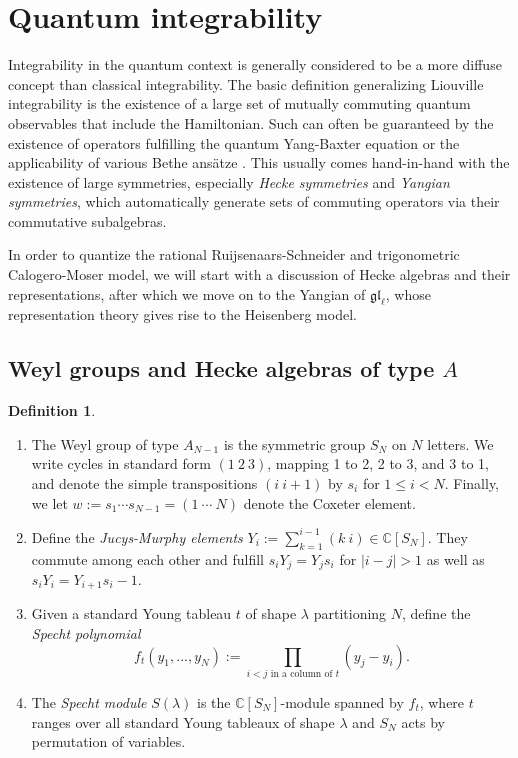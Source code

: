 \documentclass[11pt]{report}
\theoremstyle{definition}
\newtheorem{definition}[theorem]{Definition}
\theoremstyle{remark}
\theoremstyle{remark}
\newcommand{\C}{\mathbb{C}}
\begin{document}
\section{Quantum integrability}

Integrability in the quantum context is generally considered to be a more diffuse concept than classical integrability. The basic definition generalizing Liouville integrability is the existence of a large set of mutually commuting quantum observables that include the Hamiltonian. Such can often be guaranteed by the existence of operators fulfilling the quantum Yang-Baxter equation or the applicability of various Bethe ansätze \cite{book:arutyunov:betheAnsatz}. This usually comes hand-in-hand with the existence of large symmetries, especially \emph{Hecke symmetries} and \emph{Yangian symmetries}, which automatically generate sets of commuting operators via their commutative subalgebras.

In order to quantize the rational Ruijsenaars-Schneider and trigonometric Calogero-Moser model, we will start with a discussion of Hecke algebras and their representations, after which we move on to the Yangian of $\mathfrak{gl}_\ell$, whose representation theory gives rise to the Heisenberg model.

\subsection{Weyl groups and Hecke algebras of type $A$}

\begin{definition}
\begin{enumerate}[label=(\roman*)]
\item The Weyl group of type $A_{N-1}$ is the symmetric group $S_N$ on $N$ letters. We write cycles in standard form $(1 \ 2 \ 3)$, mapping 1 to 2, 2 to 3, and 3 to 1, and denote the simple transpositions $(i \ i+1)$ by $s_i$ for $1 \leq i < N$. Finally, we let $w := s_1 \cdots s_{N-1} = (1 \ \cdots \ N)$ denote the Coxeter element.
\item Define the \emph{Jucys-Murphy elements} $Y_i := \sum_{k=1}^{i-1} (k \ i) \in \C[S_N]$. They commute among each other and fulfill $s_i Y_j = Y_j s_i$ for $|i-j|>1$ as well as $s_i Y_i = Y_{i+1} s_i-1$.
\item Given a standard Young tableau $t$ of shape $\lambda$ partitioning $N$, define the \emph{Specht polynomial}
\begin{equation*}
f_t(y_1,...,y_N) := \prod_{i<j \text{ in a column of } t} (y_j-y_i).
\end{equation*}
\item The \emph{Specht module} $S(\lambda)$ is the $\C[S_N]$-module spanned by $f_t$, where $t$ ranges over all standard Young tableaux of shape $\lambda$ and $S_N$ acts by permutation of variables.
\end{enumerate}
\end{definition}
\end{document}
